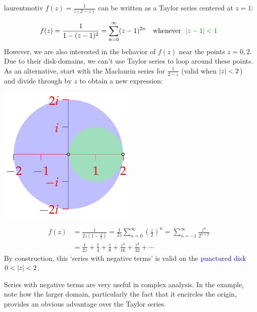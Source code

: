 \begin{example}{}{laurentmotiv}
	$f(z)=\frac 1{z(2-z)}$ can be written as a Taylor series centered at $z=1$:\par
	\begin{minipage}[t]{0.7\linewidth}\vspace{-10pt}
		\[
			f(z)=\frac 1{1-(z-1)^2} 
			=\sum_{n=0}^\infty (z-1)^{2n}
			\quad\text{whenever \ \textcolor{Green}{$\nm{z-1}<1$}}
		\]
		However, we are also interested in the behavior of $f(z)$ near the points $z=0,2$. Due to their disk-domains, we can't use Taylor series to loop around these points.\smallbreak
		As an alternative, start with the Maclaurin series for $\frac 1{2-z}$ (valid when $\left| z\right|<2$) and divide through by $z$ to obtain a new expression:
	\end{minipage}
	\hfill
	\begin{minipage}[t]{0.29\linewidth}\vspace{-10pt}
		\flushright\includegraphics[scale=0.95]{laurent}
	\end{minipage}\par\vspace{-10pt}
	\begin{align*}
		f(z)&=\frac 1{2z(1-\frac{z}{2})}
		=\frac 1{2z}\sum_{n=0}^\infty\left(\frac z2\right)^n 
		=\sum_{n=-1}^\infty\frac{z^n}{2^{n+2}}\\
		&=\frac 1{2z}+\frac 14+\frac z8+\frac{z^2}{16}+\frac{z^3}{32}+\cdots	
	\end{align*}
	By construction, this `series with negative terms' is valid on the \textcolor{blue}{punctured disk $0<\left| z\right|<2$}.
\end{example}

Series with negative terms are very useful in complex analysis. In the example, note how the larger domain, particularly the fact that it encircles the origin, provides an obvious advantage over the Taylor series.\smallbreak


